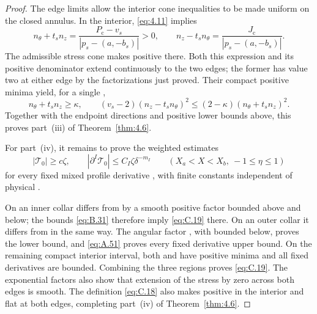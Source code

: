\begin{proof}
The edge limits allow the interior cone inequalities to be made uniform on the
closed annulus. In the interior, \eqref{eq:4.11} implies
\[
  n_\theta+t_sn_z
    =\frac{P_{\mathrm c}-v_s}{|p_s-(a,-b_s)|}>0,
  \qquad
  n_z-t_sn_\theta
    =\frac{J_{\mathrm c}}{|p_s-(a,-b_s)|}.
\]
The admissible stress cone makes
positive there. Both this expression and its positive denominator extend
continuously to the two edges; the former has value two at either edge by the
factorizations just proved. Their compact positive minima yield, for a single
,
\[
  n_\theta+t_sn_z\geq\kappa,
  \qquad
  (v_s-2)(n_z-t_sn_\theta)^2
    \leq(2-\kappa)(n_\theta+t_sn_z)^2.
\]
Together with the endpoint directions and positive lower bounds above, this
proves part~\textup{(iii)} of Theorem~\ref{thm:4.6}.

For part~\textup{(iv)}, it remains to prove the weighted estimates
\begin{equation}
  |\mathcal T_0|\geq c\zeta,
  \qquad
  |\partial^I\mathcal T_0|\leq C_I\zeta\delta^{-m_I}
  \qquad (X_a<X<X_b,\ -1\leq\eta\leq1)
  \tag{C.19}\label{eq:C.19}
\end{equation}
for every fixed mixed profile derivative
, with finite constants independent of physical
.

On an inner collar  differs from
 by a smooth positive factor bounded above
and below; the bounds \eqref{eq:B.31} therefore imply \eqref{eq:C.19} there. On
an outer collar it differs from  in the same
way. The angular factor
, with
 bounded below, proves the lower bound, and
\eqref{eq:A.51} proves every fixed derivative upper bound. On the remaining
compact interior interval, both  and
 have positive minima and all
fixed derivatives are bounded. Combining the three regions proves
\eqref{eq:C.19}. The exponential factors also show that extension of the stress
by zero across both edges is smooth. The definition \eqref{eq:C.18} also makes
 positive in the interior and flat at both edges,
completing part~\textup{(iv)} of Theorem~\ref{thm:4.6}.


\end{proof}
